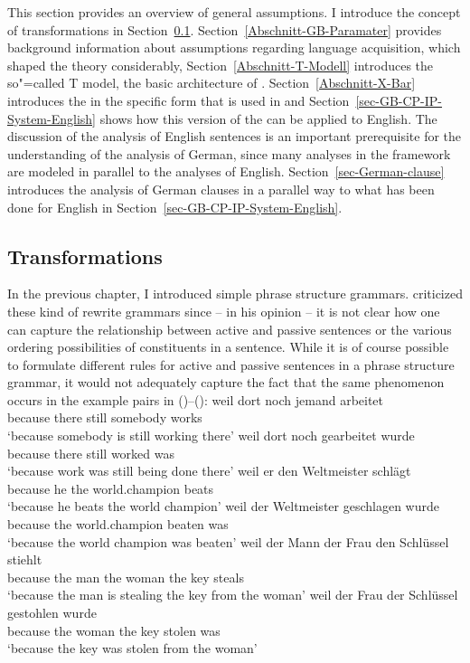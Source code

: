 This section provides an overview of general assumptions. I introduce the concept of transformations
in Section~\ref{Abschnitt-Transformationen}. Section~\ref{Abschnitt-GB-Paramater} provides
background information about assumptions regarding language acquisition, which shaped the theory
considerably, Section~\ref{Abschnitt-T-Modell} introduces the so"=called T model, the basic
architecture of \gbt. Section~\ref{Abschnitt-X-Bar} introduces the \xbart in the specific form that is used in \gb
and Section~\ref{sec-GB-CP-IP-System-English} shows how this version of the \xbart can be applied to English. The discussion of
the analysis of English sentences is an important prerequisite for the understanding of the analysis
of German, since many analyses in the \gb framework are modeled in parallel to the analyses of
English. Section~\ref{sec-German-clause} introduces the analysis of German clauses in a parallel way
to what has been done for English in Section~\ref{sec-GB-CP-IP-System-English}.

\subsection{Transformations}
\label{Abschnitt-Transformationen}

In the previous chapter, I introduced simple phrase structure
grammars. \citet[Chapter~5]{Chomsky57a} criticized these kind of rewrite grammars since -- in his
opinion -- it is not clear how one can capture the relationship between active and passive sentences or
the various ordering possibilities of constituents in a sentence. While it is of course possible to
formulate different rules for active and passive sentences in a phrase structure grammar, it would
not adequately capture the fact that the same phenomenon occurs in the example pairs in ()--():
\eal
\ex 
\gll weil dort noch jemand arbeitet\\
     because there still somebody works\\
\glt `because somebody is still working there'
\ex 
\gll weil dort noch gearbeitet wurde\\
     because there still worked was\\
\glt `because work was still being done there'	 
\zl
\eal
\ex 
\gll weil er den Weltmeister schlägt\\
	 because he the world.champion beats\\
\glt `because he beats the world champion'
\ex 
\gll weil der Weltmeister geschlagen wurde\\
	 because the world.champion beaten was\\
\glt `because the world champion was beaten'
\zl
\eal
\ex 
\gll weil der Mann der Frau den Schlüssel stiehlt\\
	 because the man the woman the key steals\\
\glt `because the man is stealing the key from the woman'
\ex 
\gll weil der Frau der Schlüssel gestohlen wurde\\
	 because the woman the key stolen was\\
\glt `because the key was stolen from the woman'
\zl

